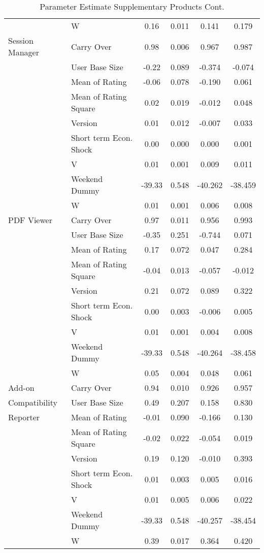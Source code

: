 \documentclass[mksc,nonblindrev]{informs3}
\begin{document}
\begin{table}
\begin{tabular}{llcccc}
	&	W	&	0.16	&	0.011	&	0.141	&	0.179	\\
Session Manager	&	Carry Over	&	0.98	&	0.006	&	0.967	&	0.987	\\
	&	User Base Size	&	-0.22	&	0.089	&	-0.374	&	-0.074	\\
	&	Mean of Rating	&	-0.06	&	0.078	&	-0.190	&	0.061	\\
	&	Mean of Rating Square	&	0.02	&	0.019	&	-0.012	&	0.048	\\
	&	Version	&	0.01	&	0.012	&	-0.007	&	0.033	\\
	&	Short term Econ. Shock	&	0.00	&	0.000	&	0.000	&	0.001	\\
	&	V	&	0.01	&	0.001	&	0.009	&	0.011	\\
	&	Weekend Dummy	&	-39.33	&	0.548	&	-40.262	&	-38.459	\\
	&	W	&	0.01	&	0.001	&	0.006	&	0.008	\\
PDF Viewer	&	Carry Over	&	0.97	&	0.011	&	0.956	&	0.993	\\
	&	User Base Size	&	-0.35	&	0.251	&	-0.744	&	0.071	\\
	&	Mean of Rating	&	0.17	&	0.072	&	0.047	&	0.284	\\
	&	Mean of Rating Square	&	-0.04	&	0.013	&	-0.057	&	-0.012	\\
	&	Version	&	0.21	&	0.072	&	0.089	&	0.322	\\
	&	Short term Econ. Shock	&	0.00	&	0.003	&	-0.006	&	0.005	\\
	&	V	&	0.01	&	0.001	&	0.004	&	0.008	\\
	&	Weekend Dummy	&	-39.33	&	0.548	&	-40.264	&	-38.458	\\
	&	W	&	0.05	&	0.004	&	0.048	&	0.061	\\
Add-on	&	Carry Over	&	0.94	&	0.010	&	0.926	&	0.957	\\
 Compatibility 	&	User Base Size	&	0.49	&	0.207	&	0.158	&	0.830	\\
 Reporter	&	Mean of Rating	&	-0.01	&	0.090	&	-0.166	&	0.130	\\
	&	Mean of Rating Square	&	-0.02	&	0.022	&	-0.054	&	0.019	\\
	&	Version	&	0.19	&	0.120	&	-0.010	&	0.393	\\
	&	Short term Econ. Shock	&	0.01	&	0.003	&	0.005	&	0.016	\\
	&	V	&	0.01	&	0.005	&	0.006	&	0.022	\\
	&	Weekend Dummy	&	-39.33	&	0.548	&	-40.257	&	-38.454	\\
	&	W	&	0.39	&	0.017	&	0.364	&	0.420	\\
		\end{tabular}
	\caption{Parameter Estimate Supplementary Products Cont.}
	\label{tab:ParameterEstimateSupplementaryProducts}
\end{table}
\end{document}
